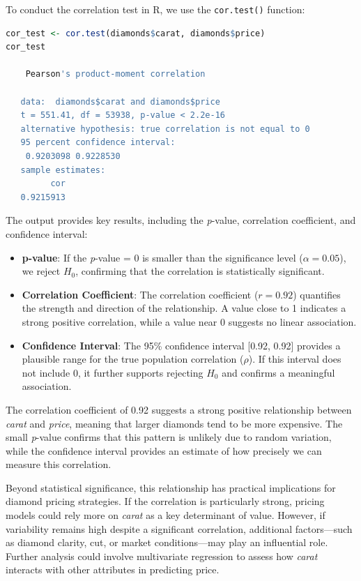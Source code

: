 \documentclass[
]{book}
\newcommand{\passthrough}[1]{#1}
\providecommand{\tightlist}{%
  \setlength{\itemsep}{0pt}\setlength{\parskip}{0pt}}
\theoremstyle{definition}
\theoremstyle{definition}
\theoremstyle{definition}
\theoremstyle{definition}
\theoremstyle{remark}
\begin{document}
To conduct the correlation test in R, we use the \passthrough{\lstinline!cor.test()!} function:

\begin{lstlisting}[language=R]
cor_test <- cor.test(diamonds$carat, diamonds$price)
cor_test
   
    Pearson's product-moment correlation
   
   data:  diamonds$carat and diamonds$price
   t = 551.41, df = 53938, p-value < 2.2e-16
   alternative hypothesis: true correlation is not equal to 0
   95 percent confidence interval:
    0.9203098 0.9228530
   sample estimates:
         cor 
   0.9215913
\end{lstlisting}

The output provides key results, including the \emph{p}-value, correlation coefficient, and confidence interval:

\begin{itemize}
\tightlist
\item
  \textbf{p-value}: If the \emph{p}-value = 0 is smaller than the significance level (\(\alpha = 0.05\)), we reject \(H_0\), confirming that the correlation is statistically significant.
\item
  \textbf{Correlation Coefficient}: The correlation coefficient (\(r = 0.92\)) quantifies the strength and direction of the relationship. A value close to 1 indicates a strong positive correlation, while a value near 0 suggests no linear association.
\item
  \textbf{Confidence Interval}: The 95\% confidence interval {[}0.92, 0.92{]} provides a plausible range for the true population correlation (\(\rho\)). If this interval does not include 0, it further supports rejecting \(H_0\) and confirms a meaningful association.
\end{itemize}

The correlation coefficient of 0.92 suggests a strong positive relationship between \emph{carat} and \emph{price}, meaning that larger diamonds tend to be more expensive. The small \emph{p}-value confirms that this pattern is unlikely due to random variation, while the confidence interval provides an estimate of how precisely we can measure this correlation.

Beyond statistical significance, this relationship has practical implications for diamond pricing strategies. If the correlation is particularly strong, pricing models could rely more on \emph{carat} as a key determinant of value. However, if variability remains high despite a significant correlation, additional factors---such as diamond clarity, cut, or market conditions---may play an influential role. Further analysis could involve multivariate regression to assess how \emph{carat} interacts with other attributes in predicting price.
\end{document}
